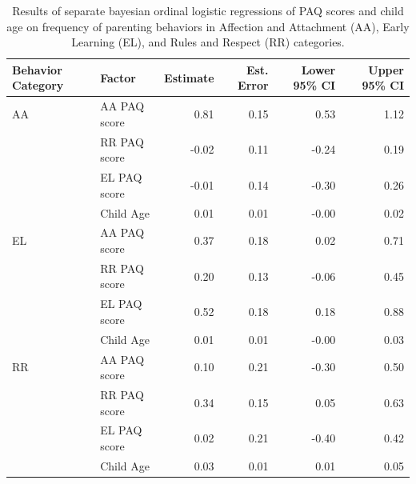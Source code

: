 \documentclass[man]{apa6}
\theoremstyle{definition}
\theoremstyle{definition}
\theoremstyle{definition}
\theoremstyle{remark}
\begin{document}
\begin{table}[h]
\centering
\caption{Results of separate bayesian ordinal logistic regressions of PAQ scores and child age on frequency of parenting behaviors in Affection and Attachment (AA), Early Learning (EL), and Rules and Respect (RR) categories.} 
\label{tab:behavetab}
\begin{tabular}{llrrrr}
  \hline
Behavior Category & Factor & Estimate & Est. Error & Lower 95\% CI & Upper 95\% CI \\ 
  \hline
AA & AA PAQ score & 0.81 & 0.15 & 0.53 & 1.12 \\ 
   & RR PAQ score & -0.02 & 0.11 & -0.24 & 0.19 \\ 
   & EL PAQ score & -0.01 & 0.14 & -0.30 & 0.26 \\ 
   & Child Age & 0.01 & 0.01 & -0.00 & 0.02 \\ 
   \hline
EL & AA PAQ score & 0.37 & 0.18 & 0.02 & 0.71 \\ 
   & RR PAQ score & 0.20 & 0.13 & -0.06 & 0.45 \\ 
   & EL PAQ score & 0.52 & 0.18 & 0.18 & 0.88 \\ 
   & Child Age & 0.01 & 0.01 & -0.00 & 0.03 \\ 
   \hline
RR & AA PAQ score & 0.10 & 0.21 & -0.30 & 0.50 \\ 
   & RR PAQ score & 0.34 & 0.15 & 0.05 & 0.63 \\ 
   & EL PAQ score & 0.02 & 0.21 & -0.40 & 0.42 \\ 
   & Child Age & 0.03 & 0.01 & 0.01 & 0.05 \\ 
   \hline
\end{tabular}
\end{table}
\end{document}
